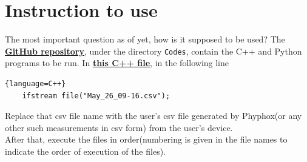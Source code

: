 \documentclass[oneside]{book}
\begin{document}
\chapter{Instruction to use}
The most important question as of yet, how is it supposed to be used? The \href{https://github.com/HarryNyquist/Odometry}{\underline{\textbf{GitHub repository}}}, under the directory \verb|Codes|, contain the C++ and Python programs to be run. In \href{https://github.com/HarryNyquist/Odometry/blob/main/Codes/1_KalmanFilter.cpp}{\underline{\textbf{this C++ file}}}, in the following line
\begin{lstlisting}{language=C++}
    ifstream file("May_26_09-16.csv");
\end{lstlisting}
Replace that csv file name with the user's csv file generated by Phyphox(or any other such measurements in csv form) from the user's device.\\
After that, execute the files in order(numbering is given in the file names to indicate the order of execution of the files). 
\end{document}
